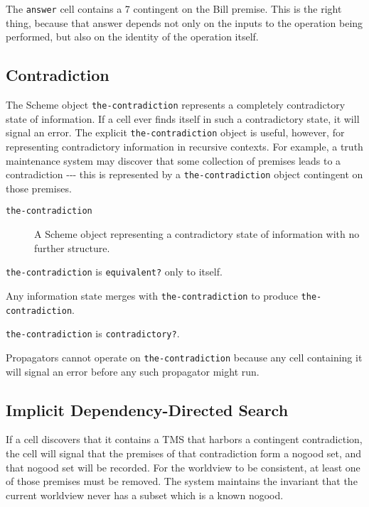 \documentclass[12pt,letterpaper,english]{article}
\begin{document}
The \texttt{answer} cell contains a 7 contingent on the Bill premise.  This
is the right thing, because that answer depends not only on the inputs
to the operation being performed, but also on the identity of the
operation itself.



\subsection{Contradiction}
\label{contradiction}

The Scheme object \texttt{the-contradiction} represents a completely
contradictory state of information.  If a cell ever finds itself in
such a contradictory state, it will signal an error.  The
explicit \texttt{the-contradiction} object is useful, however, for
representing contradictory information in recursive contexts.  For
example, a truth maintenance system may discover that some collection
of premises leads to a contradiction -{}-{}- this is represented by a
\texttt{the-contradiction} object contingent on those premises.
\begin{description}
\item[{\texttt{the-contradiction}}] \leavevmode 
A Scheme object representing a contradictory state of information
with no further structure.

\end{description}

\texttt{the-contradiction} is \texttt{equivalent?} only to itself.

Any information state merges with \texttt{the-contradiction} to produce
\texttt{the-contradiction}.

\texttt{the-contradiction} is \texttt{contradictory?}.

Propagators cannot operate on \texttt{the-contradiction} because any cell
containing it will signal an error before any such propagator might
run.



\subsection{Implicit Dependency-Directed Search}
\label{implicit-dependency-directed-search}

If a cell discovers that it contains a TMS that harbors a contingent
contradiction, the cell will signal that the premises of that
contradiction form a nogood set, and that nogood set will be recorded.
For the worldview to be consistent, at least one of those premises
must be removed.  The system maintains the invariant that the current
worldview never has a subset which is a known nogood.
\end{document}
